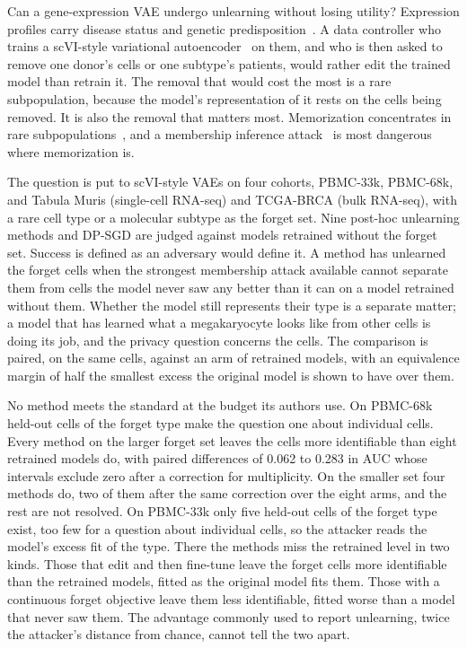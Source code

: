 \documentclass{article}
\begin{document}
Can a gene-expression VAE undergo unlearning without losing utility? Expression profiles carry disease status and genetic predisposition~\citep{walker2024}. A data controller who trains a scVI-style variational autoencoder~\citep{lopez2018} on them, and who is then asked to remove one donor's cells or one subtype's patients, would rather edit the trained model than retrain it. The removal that would cost the most is a rare subpopulation, because the model's representation of it rests on the cells being removed. It is also the removal that matters most. Memorization concentrates in rare subpopulations~\citep{feldman2020}, and a membership inference attack~\citep{shokri2017, yeom2018, carlini2022} is most dangerous where memorization is.

The question is put to scVI-style VAEs on four cohorts, PBMC-33k, PBMC-68k, and Tabula Muris (single-cell RNA-seq) and TCGA-BRCA (bulk RNA-seq), with a rare cell type or a molecular subtype as the forget set. Nine post-hoc unlearning methods and DP-SGD are judged against models retrained without the forget set. Success is defined as an adversary would define it. A method has unlearned the forget cells when the strongest membership attack available cannot separate them from cells the model never saw any better than it can on a model retrained without them. Whether the model still represents their type is a separate matter; a model that has learned what a megakaryocyte looks like from other cells is doing its job, and the privacy question concerns the cells. The comparison is paired, on the same cells, against an arm of retrained models, with an equivalence margin of half the smallest excess the original model is shown to have over them.

No method meets the standard at the budget its authors use. On PBMC-68k held-out cells of the forget type make the question one about individual cells. Every method on the larger forget set leaves the cells more identifiable than eight retrained models do, with paired differences of 0.062 to 0.283 in AUC whose intervals exclude zero after a correction for multiplicity. On the smaller set four methods do, two of them after the same correction over the eight arms, and the rest are not resolved. On PBMC-33k only five held-out cells of the forget type exist, too few for a question about individual cells, so the attacker reads the model's excess fit of the type. There the methods miss the retrained level in two kinds. Those that edit and then fine-tune leave the forget cells more identifiable than the retrained models, fitted as the original model fits them. Those with a continuous forget objective leave them less identifiable, fitted worse than a model that never saw them. The advantage commonly used to report unlearning, twice the attacker's distance from chance, cannot tell the two apart.
\end{document}
